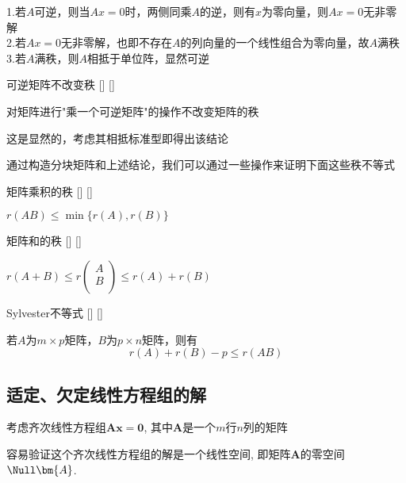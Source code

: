 \documentclass[UTF8]{ctexart}
\begin{document}
        \begin{prf}
            1.若$A$可逆，则当$Ax=0$时，两侧同乘$A$的逆，则有$x$为零向量，则$Ax=0$无非零解\\
            2.若$Ax=0$无非零解，也即不存在$A$的列向量的一个线性组合为零向量，故$A$满秩\\
            3.若$A$满秩，则$A$相抵于单位阵，显然可逆
        \end{prf}
        
	    \begin{ppt}
			[]
			{可逆矩阵不改变秩}
			[]
			[]

            对矩阵进行"乘一个可逆矩阵"的操作不改变矩阵的秩
        \end{ppt}
        \begin{prf}
            这是显然的，考虑其相抵标准型即得出该结论
        \end{prf}
        通过构造分块矩阵和上述结论，我们可以通过一些操作来证明下面这些秩不等式
        \begin{thm}
			[]
			{矩阵乘积的秩}
			[]
			[]

            $r(AB)\leq \min\{r(A),r(B)\}$
        \end{thm}
        \begin{thm}
			[]
			{矩阵和的秩}
			[]
			[]

            $r(A + B) \leq r\begin{pmatrix} A \\ B \\ \end{pmatrix} \leq r(A) + r(B)$
        \end{thm}

        \begin{thm}
			[]
			{Sylvester不等式}
			[]
			[]
        
            若$A$为$m\times p$矩阵，$B$为$p\times n$矩阵，则有
            \[r(A)+r(B)-p\leq r(AB)\]
        \end{thm}
	\subsection{适定、欠定线性方程组的解}

		考虑齐次线性方程组$\bm{A}\bm{x}=\mathbf{0}$, 其中$\bm{A}$是一个$m$行$n$列的矩阵

		容易验证这个齐次线性方程组的解是一个线性空间, 即矩阵$\bm{A}$的零空间$\Null\bm{A}$. 
\end{document}
